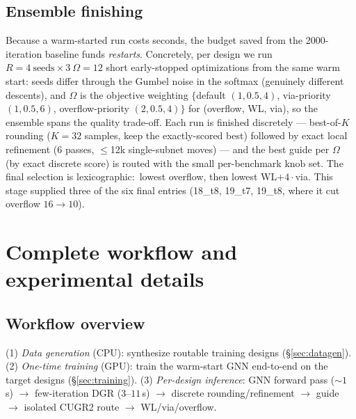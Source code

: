 \documentclass[11pt]{article}
\begin{document}
\subsection{Ensemble finishing}
Because a warm-started run costs seconds, the budget saved from the
2000-iteration baseline funds \emph{restarts}. Concretely, per design we run
$R = 4\ \text{seeds} \times 3\ \Omega = 12$ short early-stopped optimizations
from the same warm start: seeds differ through the Gumbel noise in the
softmax (genuinely different descents), and $\Omega$ is the objective
weighting $\{$default $(1,0.5,4)$, via-priority $(1,0.5,6)$,
overflow-priority $(2,0.5,4)\}$ for (overflow, WL, via), so the ensemble
spans the quality trade-off. Each run is finished discretely --- best-of-$K$
rounding ($K{=}32$ samples, keep the exactly-scored best) followed by exact
local refinement (6 passes, $\le$12k single-subnet moves) --- and the best
guide per $\Omega$ (by exact discrete score) is routed with the small
per-benchmark knob set. The final selection is lexicographic:\ lowest
overflow, then lowest WL$+4\cdot$via. This stage supplied three of the six
final entries (18\_t8, 19\_t7, 19\_t8, where it cut overflow $16\to10$).

\section{Complete workflow and experimental details}
\subsection{Workflow overview}
(1) \emph{Data generation} (CPU): synthesize routable training designs
(\S\ref{sec:datagen}). (2) \emph{One-time training} (GPU): train the
warm-start GNN end-to-end on the target designs (\S\ref{sec:training}).
(3) \emph{Per-design inference}: GNN forward pass (${\sim}1$\,s) $\to$
few-iteration DGR ($3$--$11$\,s) $\to$ discrete rounding/refinement $\to$
guide $\to$ isolated CUGR2 route $\to$ WL/via/overflow.
\end{document}
